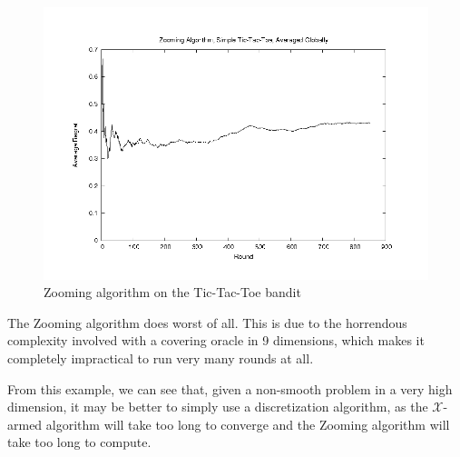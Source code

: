 \begin{figure}[!ht]
  \begin{center}
    \includegraphics[width=\figwidth]{data/tictactoe/zoomtoe_GA.png}
     \caption{Zooming algorithm on the Tic-Tac-Toe bandit}
     \label{fig:zoomtoe}
  \end{center}
\end{figure}
The Zooming algorithm does worst of all.  This is due to the horrendous
complexity involved with a covering oracle in 9 dimensions, which makes
it completely impractical to run very many rounds at all.

From this example, we can see that, given a non-smooth problem 
in a very high dimension, it may be better to simply use a discretization
algorithm, as the $\mathcal{X}$-armed algorithm will take too long to
converge and the Zooming algorithm will take too long to compute.